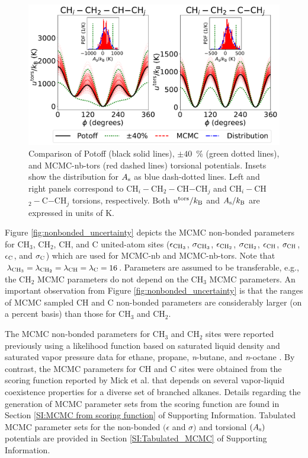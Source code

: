 \documentclass[preprint,review,12pt]{elsarticle}
\begin{document}
	\begin{figure}[htb!]
		\centering
		\includegraphics[width=6.4in]{MCMC_torsions.pdf}
		\caption{Comparison of Potoff (black solid lines), $\pm 40$~\% (green dotted lines), and MCMC-nb-tors (red dashed lines) torsional potentials. Insets show the distribution for $A_{\rm s}$ as blue dash-dotted lines. Left and right panels correspond to CH$_i-$CH$_2-$CH$-$CH$_j$ and CH$_i-$CH$_2-$C$-$CH$_j$ torsions, respectively. Both $u^{\rm tors}/k_{\rm B}$ and $A_{\rm s}/k_{\rm B}$ are expressed in units of K.}
		\label{fig:dihedral_uncertainty}
	\end{figure}

	Figure \ref{fig:nonbonded_uncertainty} depicts the MCMC non-bonded parameters for CH$_3$, CH$_2$, CH, and C united-atom sites ($\epsilon_{\rm CH_3}$, $\sigma_{\rm CH_3}$, $\epsilon_{\rm CH_2}$, $\sigma_{\rm CH_2}$, $\epsilon_{\rm CH}$, $\sigma_{\rm CH}$, $\epsilon_{\rm C}$, and $\sigma_{\rm C}$) which are used for MCMC-nb and MCMC-nb-tors. Note that $\lambda_{\rm CH_3} = \lambda_{\rm CH_2} = \lambda_{\rm CH} = \lambda_{\rm C} = 16$. Parameters are assumed to be transferable, e.g., the CH$_2$ MCMC parameters do not depend on the CH$_3$ MCMC parameters. An important observation from Figure \ref{fig:nonbonded_uncertainty} is that the ranges of MCMC sampled CH and C non-bonded parameters are considerably larger (on a percent basis) than those for CH$_3$ and CH$_2$.

	The MCMC non-bonded parameters for CH$_3$ and CH$_2$ sites were reported previously using a likelihood function based on saturated liquid density and saturated vapor pressure data for ethane, propane, \textit{n}-butane, and \textit{n}-octane \cite{Postdoc_2}. By contrast, the MCMC parameters for CH and C sites were obtained from the scoring function reported by Mick et al. \cite{Potoff_branched} that depends on several vapor-liquid coexistence properties for a diverse set of branched alkanes. Details regarding the generation of MCMC parameter sets from the scoring function are found in Section \ref{SI:MCMC from scoring function} of Supporting Information. Tabulated MCMC parameter sets for the non-bonded $(\epsilon$ and $\sigma)$ and torsional $(A_{\rm s})$ potentials are provided in Section \ref{SI:Tabulated_MCMC} of Supporting Information.
		
\end{document}
